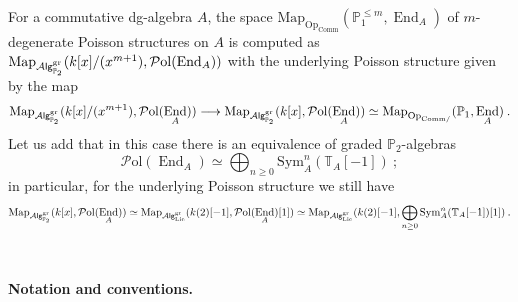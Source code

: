 \documentclass[10pt, oneside]{amsart}
\theoremstyle{plain}
\newcommand{\Alg}{\mathcal{A}\text{\sf lg}}
\newcommand{\comm}{\mathrm{Comm}}
\DeclareMathOperator{\en}{End}
\newcommand{\gr}{\mathrm{gr}}
\newcommand{\lie}{\mathrm{Lie}}
\newcommand{\map}{\mathrm{Map}}
\newcommand{\op}{\mathrm{Op}}
\newcommand{\PP}{\mathbb{P}}
\newcommand{\Pol}{\mathcal{P}\mathrm{ol}}
\newcommand{\sym}{\mathrm{Sym}}
\newcommand{\TT}{\mathbb{T}}
\begin{document}
For a commutative dg-algebra $A$, the space $\map_{\op_{\comm}}(\PP_1^{\le m}, \en_A)$
of $m$-degenerate Poisson structures on $A$ is computed as $\map_{\Alg_{\PP_2}^\gr} (k[x]/(x^{m+1}), \Pol(\en_A))$ with the underlying
Poisson structure given by the map
\begin{equation*}
\map_{\Alg_{\PP_2}^\gr} (k[x]/(x^{m+1}), \Pol(\en_A)) \longrightarrow \map_{\Alg_{\PP_2}^\gr} (k[x], \Pol(\en_A)) \simeq \map_{\op_{\comm/}} (\PP_1, \en_A) \:.
\end{equation*}
Let us add that in this case there is an equivalence of graded $\PP_2$-algebras
\begin{equation*}
\Pol(\en_A) \simeq \bigoplus_{n \ge 0} \sym_A^n (\TT_A[-1]) \:;
\end{equation*}
in particular, for the underlying Poisson structure we still have
\begin{equation*}
\map_{\Alg_{\PP_2}^\gr} (k[x], \Pol(\en_A)) \simeq \map_{\Alg_{\lie}^\gr} (k(2)[-1], \Pol(\en_A)[1]) \simeq \map_{\Alg_{\lie}^\gr} (k(2)[-1], \bigoplus_{n \ge 0} \sym_A^n (\TT_A[-1])[1]) \:.
\end{equation*}


\

\smallskip

\noindent \textbf{Notation and conventions.}
\end{document}
